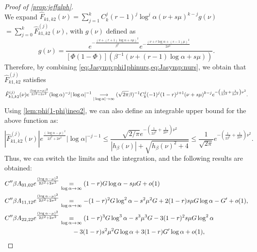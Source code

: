 \begin{proof}[Proof of \cref{prop:jeffalph}]
\begin{equation}
\end{equation}
We expand $\hat F_{k1,k2}(\nu) = \sum_{j=1}^kC_k^j(r-1)^j\log^j\alpha(\nu+s\mu)^{k-j}g(\nu)$ $ = \sum_{j=0}^k\hat F_{k1,k2}^{(j)}(\nu)$, with $g(\nu)$ defined as    \begin{equation}
        g(\nu) = \frac{e^{-\frac{(\nu + (r+1)\log\alpha +s\mu)^2 }{\beta^2} } e^{-\frac{(\nu +r\log\alpha+ (s-1)\mu)^2}{2\sigma^2}}}{\left[\Phi(1-\Phi)\right](\beta^{-1}(\nu + (r-1)\log\alpha + s\mu))}.
    \end{equation}
Therefore, by combining \cref{eq:Jasymp:phi1phinurs,eq:Jasymp:nurs}, we obtain that $\hat F_{k1,k2}^{(j)}$ satisfies
    \begin{equation}
         \hat F_{k1,k2}^{(j)}(\nu)e^{\frac{(\log\alpha-\mu)^2}{2\beta^2+2\sigma^2}}(\log\alpha)^{-j}|\log\alpha|^{-1} 
            \overset{\ }{\underset{|\log\alpha|\rightarrow\infty}{\longrightarrow}} (\sqrt{2\pi}\beta)^{-1}C_k^j(-1)^j(1-r)^{j+1}(\nu+s\mu)^{k-j} e^{-\left(\frac{1}{2\beta^2}+\frac{1}{2\sigma^2}\right)\nu^2}.
    \end{equation}
Using \cref{lem:phi(1-phi)ineq2}, we can also define an integrable upper bound for the above function as: %
\begin{equation}
    |\hat F_{k1,k2}^{(j)}(\nu)|e^{\frac{(\log\alpha-\mu)^2}{2\beta^2+2\sigma^2}}|\log\alpha|^{-j-1} \leq \frac{\sqrt{2/\pi}e^{-\left(\frac{1}{2\beta^2}+\frac{1}{2\sigma^2}\right)\nu^2}}{ |h_\beta(\nu)|+\sqrt{h_\beta(\nu)^2+4}} \leq\frac{1}{\sqrt{2\pi}}e^{-\left(\frac{1}{2\beta^2}+\frac{1}{2\sigma^2}\right)\nu^2}.
\end{equation}
Thus, we can switch the limits and the integration, and the following results are obtained:
\begin{align}
    C''\beta A_{01,02}e^{\frac{(\log\alpha-\mu)^2}{2\beta^2+2\sigma^2}} &\aseq{\log\alpha\rightarrow\infty} (1-r)G\log\alpha - s\mu G  +o(1)\\
    C''\beta A_{11,12}e^{\frac{(\log\alpha-\mu)^2}{2\beta^2+2\sigma^2}}
        &\aseq{\log\alpha\rightarrow\infty} -(1-r)^2G\log^2\alpha - s^2\mu^2 G 
        + 2(1-r)s\mu G\log\alpha - G' + o(1),\\
C''\beta A_{22,22}e^{\frac{(\log\alpha-\mu)^2}{2\beta^2+2\sigma^2}}
&\aseq{\log\alpha\rightarrow\infty} %
(1-r)^3G\log^3\alpha - s^3\mu^3 G 
-3(1-r)^2s\mu G\log^2\alpha \\
&\hspace*{2em}-3(1-r)s^2\mu^2 G\log\alpha+3(1-r)G'\log\alpha  + o(1), \nonumber

\end{align}
\end{proof}
